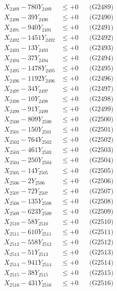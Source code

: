 \documentclass[a4paper,10pt]{article}
\begin{document}
{\begin{align}
X_{2489} - 780Y_{2489} &\leq +0 && \text{(G2489)} \\
X_{2490} - 39Y_{2490} &\leq +0 && \text{(G2490)} \\
\allowbreak
X_{2491} - 940Y_{2491} &\leq +0 && \text{(G2491)} \\
X_{2492} - 1451Y_{2492} &\leq +0 && \text{(G2492)} \\
X_{2493} - 13Y_{2493} &\leq +0 && \text{(G2493)} \\
X_{2494} - 37Y_{2494} &\leq +0 && \text{(G2494)} \\
X_{2495} - 1478Y_{2495} &\leq +0 && \text{(G2495)} \\
X_{2496} - 1192Y_{2496} &\leq +0 && \text{(G2496)} \\
X_{2497} - 34Y_{2497} &\leq +0 && \text{(G2497)} \\
X_{2498} - 10Y_{2498} &\leq +0 && \text{(G2498)} \\
X_{2499} - 91Y_{2499} &\leq +0 && \text{(G2499)} \\
X_{2500} - 809Y_{2500} &\leq +0 && \text{(G2500)} \\
\allowbreak
X_{2501} - 150Y_{2501} &\leq +0 && \text{(G2501)} \\
X_{2502} - 764Y_{2502} &\leq +0 && \text{(G2502)} \\
X_{2503} - 461Y_{2503} &\leq +0 && \text{(G2503)} \\
X_{2504} - 250Y_{2504} &\leq +0 && \text{(G2504)} \\
X_{2505} - 14Y_{2505} &\leq +0 && \text{(G2505)} \\
X_{2506} - 2Y_{2506} &\leq +0 && \text{(G2506)} \\
X_{2507} - 72Y_{2507} &\leq +0 && \text{(G2507)} \\
X_{2508} - 135Y_{2508} &\leq +0 && \text{(G2508)} \\
X_{2509} - 623Y_{2509} &\leq +0 && \text{(G2509)} \\
X_{2510} - 58Y_{2510} &\leq +0 && \text{(G2510)} \\
\allowbreak
X_{2511} - 610Y_{2511} &\leq +0 && \text{(G2511)} \\
X_{2512} - 558Y_{2512} &\leq +0 && \text{(G2512)} \\
X_{2513} - 51Y_{2513} &\leq +0 && \text{(G2513)} \\
X_{2514} - 941Y_{2514} &\leq +0 && \text{(G2514)} \\
X_{2515} - 38Y_{2515} &\leq +0 && \text{(G2515)} \\
X_{2516} - 431Y_{2516} &\leq +0 && \text{(G2516)} \\

\end{align}}
\end{document}
